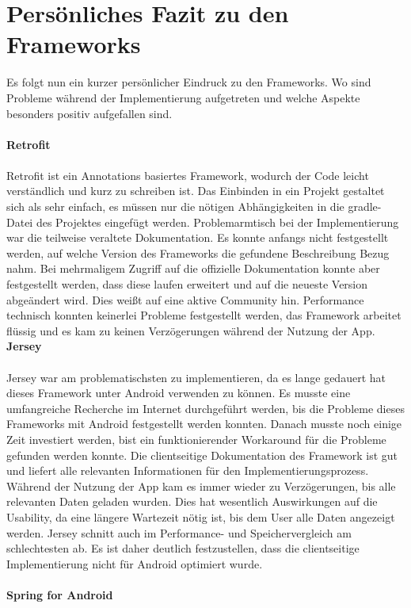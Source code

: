 \section{Persönliches Fazit zu den Frameworks}
Es folgt nun ein kurzer persönlicher Eindruck zu den Frameworks. Wo sind Probleme während der Implementierung aufgetreten und welche Aspekte besonders positiv aufgefallen sind.
\\\\
{\large \textbf{Retrofit}}\\\\
Retrofit ist ein Annotations basiertes Framework, wodurch der Code leicht verständlich und kurz zu schreiben ist. Das Einbinden in ein Projekt gestaltet sich als sehr einfach, es müssen nur die nötigen Abhängigkeiten in die gradle-Datei des Projektes eingefügt werden. Problemarmtisch bei der Implementierung war die teilweise veraltete Dokumentation. Es konnte anfangs nicht festgestellt werden, auf welche Version des Frameworks die gefundene Beschreibung Bezug nahm. Bei mehrmaligem Zugriff auf die offizielle Dokumentation konnte aber festgestellt werden, dass diese laufen erweitert und auf die neueste Version abgeändert wird. Dies weißt auf eine aktive Community hin. Performance technisch konnten keinerlei Probleme festgestellt werden, das Framework arbeitet flüssig und es kam zu keinen Verzögerungen während der Nutzung der App.
\newpage
{\large \textbf{Jersey}}\\\\
Jersey war am problematischsten zu implementieren, da es lange gedauert hat dieses Framework unter Android verwenden zu können. Es musste eine umfangreiche Recherche im Internet durchgeführt werden, bis die Probleme dieses Frameworks mit Android festgestellt werden konnten. Danach musste noch einige Zeit investiert werden, bist ein funktionierender Workaround für die Probleme gefunden werden konnte. Die clientseitige Dokumentation des Framework ist gut und liefert alle relevanten Informationen für den Implementierungsprozess. Während der Nutzung der App kam es immer wieder zu Verzögerungen, bis alle relevanten Daten geladen wurden. Dies hat wesentlich Auswirkungen auf die Usability, da eine längere Wartezeit nötig ist, bis dem User alle Daten angezeigt werden. Jersey schnitt auch im Performance- und Speichervergleich am schlechtesten ab. Es ist daher deutlich festzustellen, dass die clientseitige Implementierung nicht für Android optimiert wurde.
\\\\
{\large \textbf{Spring for Android}}\\\\
